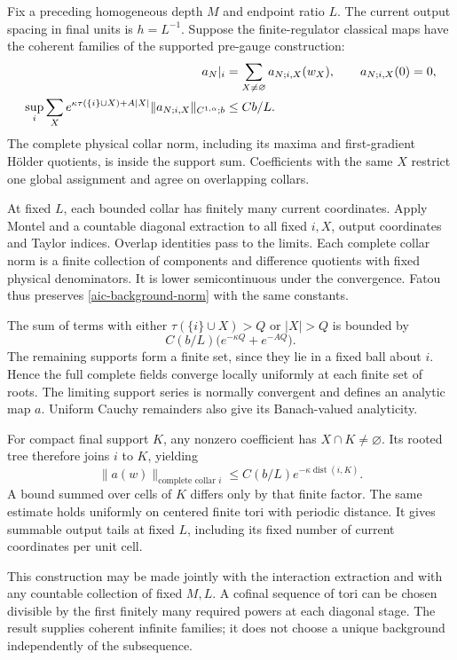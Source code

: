 Fix a preceding homogeneous depth \(M\) and endpoint ratio \(L\).
The current output spacing in final units is \(h=L^{-1}\).
Suppose the finite-regulator classical maps have the coherent
families of the supported pre-gauge construction:
\begin{align}
 a_N|_i&=\sum_{X\ne\varnothing}a_{N;i,X}(w_X),
       \qquad a_{N;i,X}(0)=0,\notag\\
 \sup_i\sum_X e^{\kappa\tau(\{i\}\cup X)+A|X|}
       \|a_{N;i,X}\|_{C^{1,\alpha};b}
       &\le Cb/L .
 \label{aic-background-norm}
\end{align}
The complete physical collar norm, including its maxima and
first-gradient H\"older quotients, is inside the support sum.
Coefficients with the same \(X\) restrict one global assignment
and agree on overlapping collars.

At fixed \(L\), each bounded collar has finitely many current
coordinates. Apply Montel and a countable diagonal extraction
to all fixed \(i,X\), output coordinates and Taylor indices.
Overlap identities pass to the limits. Each complete collar
norm is a finite collection of components and difference
quotients with fixed physical denominators. It is lower
semicontinuous under the convergence. Fatou thus preserves
\eqref{aic-background-norm} with the same constants.

The sum of terms with either
\(\tau(\{i\}\cup X)>Q\) or \(|X|>Q\) is bounded by
\[
 C(b/L)\bigl(e^{-\kappa Q}+e^{-AQ}\bigr).
\]
The remaining supports form a finite set, since they lie in
a fixed ball about \(i\). Hence the full complete fields
converge locally uniformly at each finite set of roots.
The limiting support series is normally convergent and
defines an analytic map \(a\). Uniform Cauchy remainders
also give its Banach-valued analyticity.

For compact final support \(K\), any nonzero coefficient has
\(X\cap K\ne\varnothing\). Its rooted tree therefore joins
\(i\) to \(K\), yielding
\begin{equation}
 \|a(w)\|_{\text{complete collar }i}
        \le C(b/L)e^{-\kappa\operatorname{dist}(i,K)}.
 \label{aic-background-tail}
\end{equation}
A bound summed over cells of \(K\) differs only by that finite
factor. The same estimate holds uniformly on centered finite
tori with periodic distance. It gives summable output tails
at fixed \(L\), including its fixed number of current coordinates
per unit cell.

This construction may be made jointly with the interaction
extraction and with any countable collection of fixed \(M,L\).
A cofinal sequence of tori can be chosen divisible by the first
finitely many required powers at each diagonal stage. The
result supplies coherent infinite families; it does not choose
a unique background independently of the subsequence.


